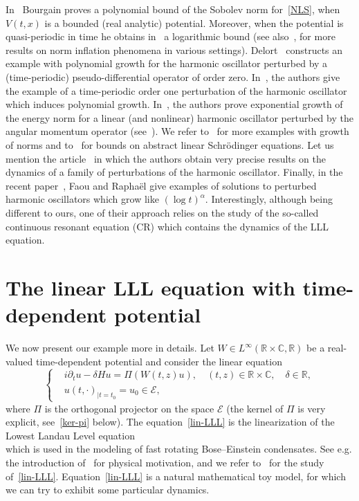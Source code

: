 \documentclass[10pt]{amsart}
\theoremstyle{definition}\newtheorem{defi}[theo]{Definition}\newtheorem{rema}[theo]{Remark}\newtheorem{exam}[theo]{Example}\newtheorem{exem}[theo]{Example}\newtheorem{nota}[theo]{Notation}
\newcommand{\C}{\mathbb{C}}
\newcommand{\R}{\mathbb{R}}
\newcommand{\E}{\mathcal{E}}
\newcommand{\<}{\langle}
\renewcommand{\>}{\rangle}
\begin{document}
In~\cite{Bou99a} Bourgain proves a polynomial bound of the Sobolev norm for~\eqref{NLS}, when $V(t,x)$ is a bounded (real analytic) potential. Moreover, when the potential is quasi-periodic in time he obtains in~\cite{Bou99b} a logarithmic bound (see also~\cite{Delort,FangZhang, GPT,Wang2008}, for more results on norm inflation phenomena in various settings). Delort~\cite{Delort2} constructs an example with polynomial growth for the harmonic oscillator perturbed by a (time-periodic) pseudo-differential operator of order zero. In~\cite{BGMR2}, the authors give the example of a time-periodic order one perturbation of the harmonic oscillator which induces polynomial growth. In~\cite{ANS}, the authors prove exponential growth of the energy norm for a linear (and nonlinear) harmonic oscillator perturbed by the angular momentum operator (see~\cite[Theorem~4.5]{ANS}). We refer to~\cite{HausMaspero,Maspero} for more examples with growth of norms and to~\cite{BGMR} for bounds on abstract linear Schr\"odinger equations. Let us mention the article~\cite{LZZ} in which the authors obtain very precise results on the dynamics of a family of perturbations of the harmonic oscillator. Finally, in the recent paper~\cite{Faou-Rapha}, Faou and Rapha\"el give examples of solutions to perturbed harmonic oscillators which grow like $(\log t)^\alpha$. Interestingly, although being different to ours, one of their approach relies on the study of the so-called continuous resonant equation (CR) which contains the dynamics of the LLL equation.



\section{The linear LLL equation with time-dependent potential}\label{Sect2}

We now present our example more in details. Let $W\in L^{\infty}(\R\times
\C,\R)$ be a real-valued time-dependent potential and consider the linear equation
\begin{equation}\label{lin-LLL}
\left\{
\begin{aligned}
&i\partial_t u- \delta H u=\Pi\left(W(t,z)u\right), \quad (t,z)\in \R\times \C, \quad \delta \in \R,\\
&u(t, \cdot)_{|t=t_0}= u_0 \in \E,
\end{aligned}
\right.
\end{equation}
where $\Pi$ is the orthogonal projector on the space $\E$ (the kernel of $\Pi$ is very explicit, see~\eqref{ker-pi} below). The equation~\eqref{lin-LLL} is the linearization of the Lowest Landau Level equation
\begin{equation}\label{eq-disp}
\end{equation}
which is used in the modeling of fast rotating Bose--Einstein condensates. See e.g. the introduction of~\cite{GGT} for physical motivation, and we refer to~\cite{ABN,BiBiCrEv2, BiBiEv,GGT, Nier,Schw-Tho} for the study of~\eqref{lin-LLL}. Equation~\eqref{lin-LLL} is a natural mathematical toy model, for which we can try to exhibit some particular dynamics.
\end{document}
